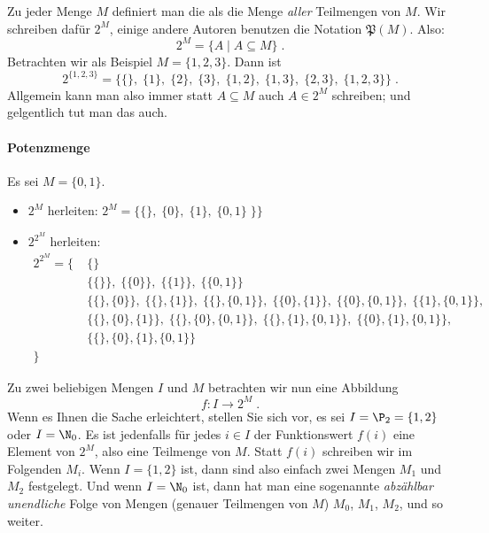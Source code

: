Zu jeder Menge $M$ definiert man die
 als die Menge \emph{aller}
Teilmengen von $M$.
%
Wir schreiben dafür $2^M$, einige andere Autoren benutzen die Notation
$\mathfrak{P}(M)$.
%
Also:
\[
  2^M = \{ A \mid A \subseteq M \} \;.
\]
%
Betrachten wir als Beispiel $M=\{1,2,3\}$.
%
Dann ist
\[
  2^{\{1,2,3\}} = \{ \{\} ,\; \{1\} ,\; \{2\} ,\; \{3\} ,\; \{1,2\}
  ,\; \{1,3\} ,\; \{2,3\} ,\; \{1,2,3\} \} \;.
\]
%
Allgemein kann man also immer statt $A\subseteq M$ auch $A\in 2^M$
schreiben; und gelgentlich tut man das auch.
%
\begin{tutorium}
  \paragraph{Potenzmenge}

  Es sei $M=\{0,1\}$.
  \begin{itemize}
  \item $2^M$ herleiten: $2^M=\{ \{\} ,\; \{0\} ,\; \{1\} ,\; \{0,1\} \;\}\} $
  \item $2^{2^M}$ herleiten:
    \begin{align*}
      2^{2^M} = \{ \; & \{\} \\
                      & \{\{\}\} ,\; \{\{0\}\} ,\; \{\{1\}\} ,\; \{\{0,1\}\} \\
                      & \{\{\},\{0\}\} ,\; \{\{\},\{1\}\} ,\; \{\{\},\{0,1\}\} ,\; \{\{0\},\{1\}\} ,\; \{\{0\},\{0,1\}\} ,\; \{\{1\},\{0,1\}\}, \\
                      & \{\{\},\{0\},\{1\}\} ,\; \{\{\},\{0\},\{0,1\}\} ,\; \{\{\},\{1\},\{0,1\}\} ,\; \{\{0\},\{1\},\{0,1\}\} ,\; \\
                      & \{\{\},\{0\},\{1\},\{0,1\}\} \\
                \} \;
    \end{align*}
  \end{itemize}
\end{tutorium}

Zu zwei beliebigen Mengen $I$ und $M$ betrachten wir nun eine Abbildung
\[
  f \colon I \to 2^M \;.
\]
%
Wenn es Ihnen die Sache erleichtert, stellen Sie sich vor, es sei \zB
$I=\P_2=\{1,2\}$ oder $I=\N_0$.
%
Es ist jedenfalls für jedes $i\in I$ der Funktionswert $f(i)$ eine
Element von $2^M$, also eine Teilmenge von $M$.
%
Statt $f(i)$ schreiben wir im Folgenden $M_i$.
%
Wenn $I=\{1,2\}$ ist, dann sind also einfach zwei Mengen $M_1$ und
$M_2$ festgelegt.
%
Und wenn $I=\N_0$ ist, dann hat man eine sogenannte \emph{abzählbar
  unendliche} Folge von Mengen (genauer Teilmengen von $M$) $M_0$,
$M_1$, $M_2$, und so weiter.

